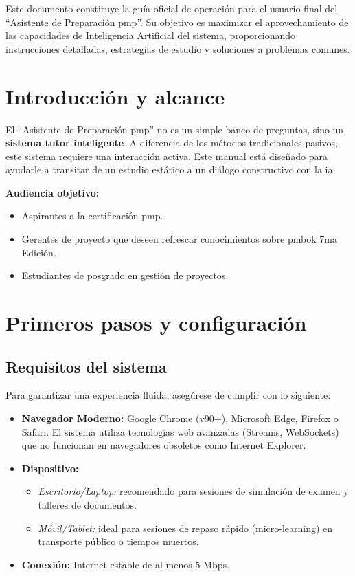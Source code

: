 Este documento constituye la guía oficial de operación para el usuario final del \enquote{Asistente de Preparación \gls{pmp}}. Su objetivo es maximizar el aprovechamiento de las capacidades de Inteligencia Artificial del sistema, proporcionando instrucciones detalladas, estrategias de estudio y soluciones a problemas comunes.

\section{Introducción y alcance}

El \enquote{Asistente de Preparación \gls{pmp}} no es un simple banco de preguntas, sino un \textbf{sistema tutor inteligente}. A diferencia de los métodos tradicionales pasivos, este sistema requiere una interacción activa. Este manual está diseñado para ayudarle a transitar de un estudio estático a un diálogo constructivo con la \gls{ia}.

\textbf{Audiencia objetivo:}
\begin{itemize}
\item Aspirantes a la certificación \gls{pmp}.
\item Gerentes de proyecto que deseen refrescar conocimientos sobre \gls{pmbok} 7ma Edición.
\item Estudiantes de posgrado en gestión de proyectos.
\end{itemize}
\section{Primeros pasos y configuración}

\subsection{Requisitos del sistema}
Para garantizar una experiencia fluida, asegúrese de cumplir con lo siguiente:
\begin{itemize}
\item \textbf{Navegador Moderno:} Google Chrome (v90+), Microsoft Edge, Firefox o Safari. El sistema utiliza tecnologías web avanzadas (Streams, WebSockets) que no funcionan en navegadores obsoletos como Internet Explorer.
\item \textbf{Dispositivo:}
\begin{itemize}
\item \textit{Escritorio/Laptop:} recomendado para sesiones de simulación de examen y talleres de documentos.
\item \textit{Móvil/Tablet:} ideal para sesiones de repaso rápido (micro-learning) en transporte público o tiempos muertos.
\end{itemize}
\item \textbf{Conexión:} Internet estable de al menos 5 Mbps.
\end{itemize}
